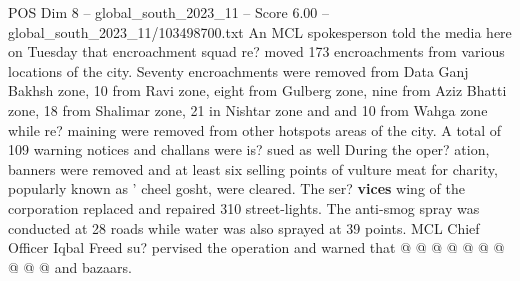 \begin{textsample}{POS Dim 8 – global\_south\_2023\_11 – Score 6.00 – global\_south\_2023\_11/103498700.txt}
An MCL spokesperson told the media here on Tuesday that encroachment squad re? moved 173 encroachments from various locations of the city.
Seventy encroachments were removed from Data Ganj Bakhsh zone, 10 from Ravi zone, eight from Gulberg zone, nine from Aziz Bhatti zone, 18 from Shalimar zone, 21 in Nishtar zone and and 10 from Wahga zone while re? maining were removed from other hotspots areas of the city.
A total of 109 warning notices and challans were is? sued as well During the oper? ation, banners were removed and at least six selling points of vulture meat for charity, popularly known as ' cheel gosht, were cleared.
The ser? \textbf{vices} wing of the corporation replaced and repaired 310 street-lights.
The anti-smog spray was conducted at 28 roads while water was also sprayed at 39 points.
MCL Chief Officer Iqbal Freed su? pervised the operation and warned that @ @ @ @ @ @ @ @ @ @ and bazaars.

\end{textsample}
